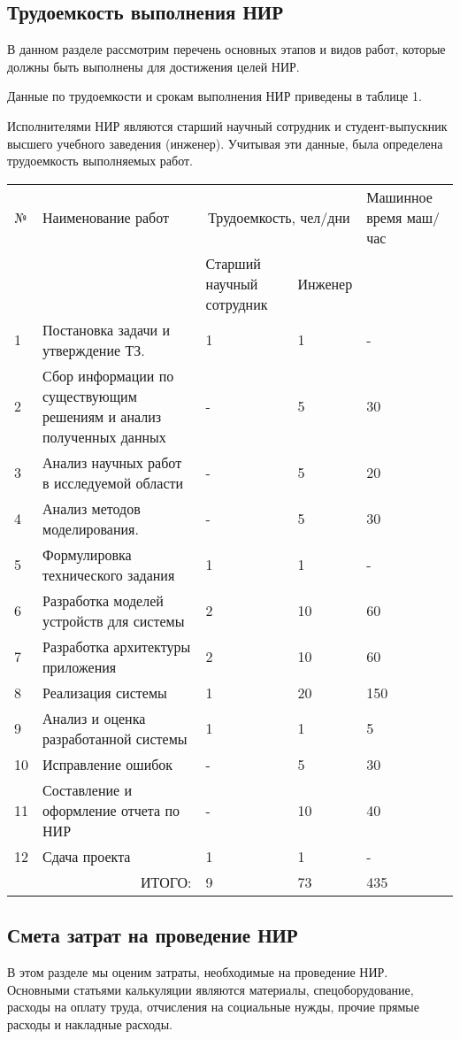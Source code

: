 \subsection*{Трудоемкость выполнения НИР}
В данном разделе рассмотрим перечень основных этапов и видов работ, которые должны быть выполнены для достижения целей НИР.

Данные по трудоемкости и срокам выполнения НИР приведены в таблице 1.

Исполнителями НИР являются старший научный сотрудник и студент-выпускник высшего учебного заведения (инженер). Учитывая эти данные, была определена трудоемкость выполняемых работ.

\begin{tabular}{|p{1em}|p{15em}|p{8em}|p{6em}|p{10em}|}
  \hline
  № & Наименование работ & \multicolumn{2}{|c|}{Трудоемкость, чел/дни} & Машинное время маш/час \\
  \ & \ & Старший научный сотрудник & Инженер & \ \\ \hline
  1 & Постановка задачи и утверждение ТЗ. & 1 & 1 & - \\ \hline
  2 & Сбор информации по существующим решениям и анализ полученных данных & - & 5 & 30 \\ \hline
  3 & Анализ научных работ в исследуемой области & - & 5 & 20 \\ \hline
  4 & Анализ методов моделирования. & - & 5 & 30  \\ \hline
  5 & Формулировка технического задания  & 1 & 1 & - \\ \hline
  6 & Разработка моделей устройств для системы  & 2 & 10 & 60 \\ \hline
  7 & Разработка архитектуры приложения & 2 & 10 & 60  \\ \hline
  8 & Реализация системы & 1 & 20 & 150  \\ \hline
  9 & Анализ и оценка разработанной системы & 1 & 1 & 5 \\ \hline
  10 & Исправление ошибок & - & 5 & 30  \\ \hline
  11 & Составление и оформление отчета по НИР & - & 10 & 40 \\ \hline
  12 & Сдача проекта & 1 & 1 & - \\ \hline
  \multicolumn{2}{|r|}{ИТОГО:} & 9 & 73 & 435 \\ \hline
\end{tabular}

\subsection*{Смета затрат на проведение НИР}
В этом разделе мы оценим затраты, необходимые на проведение НИР. Основными статьями калькуляции являются материалы, спецоборудование, расходы на оплату труда, отчисления на социальные нужды, прочие прямые расходы и накладные расходы.

